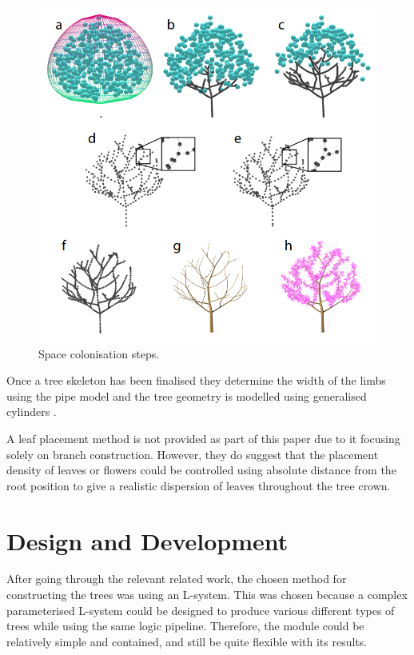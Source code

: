 \documentclass[final]{cmpreport}
\begin{document}
\begin{figure}[ht]
    \includegraphics[scale=0.5]{space-colonisation.PNG} 
    \centering
    \captionsetup{justification=centering}
    \caption{Space colonisation steps.}
    \label{fig:space-colonisation}
\end{figure}

Once a tree skeleton has been finalised they determine the width of the limbs using the pipe 
model \citep{shinozaki1964quantitative} and the tree geometry is modelled using generalised 
cylinders \citep{bloomenthal1985modeling}.

A leaf placement method is not provided as part of this paper due to it focusing solely on 
branch construction. However, they do suggest that the placement density of leaves or flowers 
could be controlled using absolute distance from the root position to give a realistic dispersion 
of leaves throughout the tree crown.

\section{Design and Development}
After going through the relevant related work, the chosen method for constructing the trees was 
using an L-system. This was chosen because a complex parameterised L-system could be designed to 
produce various different types of trees while using the same logic pipeline. Therefore, the 
module could be relatively simple and contained, and still be quite flexible with its results.
\end{document}
